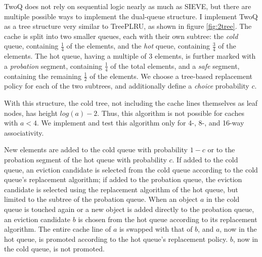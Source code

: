 \documentclass[letterpaper]{article}
\begin{document}
TwoQ does not rely on sequential logic nearly as much as SIEVE,
but there are multiple possible ways to implement the dual-queue structure.
I implement TwoQ as a tree structure very similar to TreePLRU, as shown in figure \ref{fig:2tree}.
The cache is split into two smaller queues, each with their own subtree:
the \textit{cold} queue, containing $\frac{1}{4}$ of the elements,
and the \textit{hot} queue, containing $\frac{3}{4}$ of the elements.
The hot queue, having a multiple of 3 elements,
is further marked with
a \textit{probation} segment, containing $\frac{1}{4}$ of the total elements,
and a \textit{safe} segment, containing the remaining $\frac{1}{2}$ of the elements.
We choose a tree-based replacement policy for each of the two subtrees,
and additionally define a \textit{choice} probability $c$.

With this structure, the cold tree,
not including the cache lines themselves as leaf nodes, has height $log(a) - 2$.
Thus, this algorithm is not possible for caches with $a < 4$.
We implement and test this algorithm only for 4-, 8-, and 16-way associativity.

New elements are added to the cold queue with probability $1 - c$
or to the probation segment of the hot queue with probability $c$.
If added to the cold queue, an eviction candidate is selected from the cold queue
according to the cold queue's replacement algorithm;
if added to the probation queue, the eviction candidate is selected using the replacement algorithm
of the hot queue, but limited to the subtree of the probation queue.
When an object $a$ in the cold queue is touched again
or a new object is added directly to the probation queue,
an eviction candidate $b$ is chosen from the hot queue according to its replacement algorithm.
The entire cache line of $a$ is swapped with that of $b$,
and $a$, now in the hot queue, is promoted according to the hot queue's replacement policy.
$b$, now in the cold queue, is not promoted.
\end{document}
